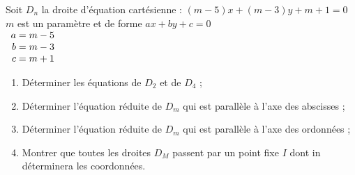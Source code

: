Soit $D_n $ la droite d'équation cartésienne : $(m - 5)x + (m - 3)y + m + 1 = 0 $ \\

$m$ est un paramètre et de  forme  $ax + by +c = 0$\\

$ \begin{array}{r@{$\;$}l}
a &= m-5\\
b &= m-3\\
c &= m+1\\
\end{array}$

\begin{enumerate}
\item Déterminer les équations de $D_2$ et de $D_4$ ; 
\item Déterminer l'équation réduite de $D_m$ qui est parallèle à l'axe des abscisses ;
\item Déterminer l'équation réduite de $D_m$ qui est parallèle à l'axe des ordonnées ;  
\item Montrer que toutes les droites $D_M$ passent par un point fixe $I$ dont in déterminera les coordonnées.
\end{enumerate}

